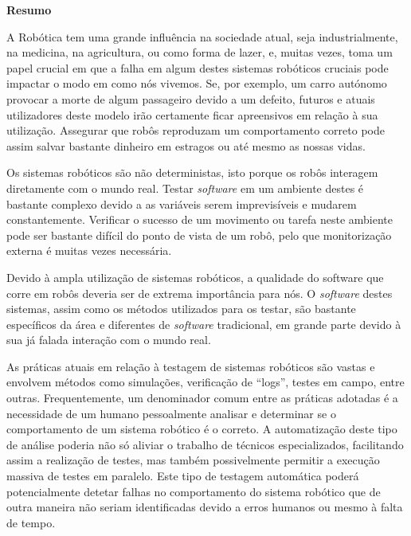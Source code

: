 
\vspace*{2cm}
\begin{center} \Large \bf Resumo
\end{center}
\vspace*{1cm} \setlength{\baselineskip}{0.6cm}

A Robótica tem uma grande influência na sociedade atual, seja industrialmente, na medicina, na agricultura, ou como forma de lazer, e, muitas vezes, toma um papel crucial em que a falha em algum destes sistemas robóticos cruciais pode impactar o modo em como nós vivemos. Se, por exemplo, um carro autónomo provocar a morte de algum passageiro devido a um defeito, futuros e atuais utilizadores deste modelo irão certamente ficar apreensivos em relação à sua utilização. Assegurar que robôs reproduzam um comportamento correto pode assim salvar bastante dinheiro em estragos ou até mesmo as nossas vidas.

Os sistemas robóticos são não deterministas, isto porque os robôs interagem diretamente com o mundo real. Testar \textit{software} em um ambiente destes é bastante complexo devido a as variáveis serem imprevisíveis e mudarem constantemente. Verificar o sucesso de um movimento ou tarefa neste ambiente pode ser bastante difícil do ponto de vista de um robô, pelo que monitorização externa é muitas vezes necessária. 

Devido à ampla utilização de sistemas robóticos, a qualidade do software que corre em robôs deveria ser de extrema importância para nós. O \textit{software} destes sistemas, assim como os métodos utilizados para os testar, são bastante específicos da área e diferentes de \textit{software} tradicional, em grande parte devido à sua já falada interação com o mundo real.

As práticas atuais em relação à testagem de sistemas robóticos são vastas e envolvem métodos como simulações, verificação de “logs”, testes em campo, entre outras. Frequentemente, um denominador comum entre as práticas adotadas é a necessidade de um humano pessoalmente analisar e determinar se o comportamento de um sistema robótico é o correto. A automatização deste tipo de análise poderia não só aliviar o trabalho de técnicos especializados, facilitando assim a realização de testes, mas também possivelmente permitir a execução massiva de testes em paralelo. Este tipo de testagem automática poderá potencialmente detetar falhas no comportamento do sistema robótico que de outra maneira não seriam identificadas devido a erros humanos ou mesmo à falta de tempo.

